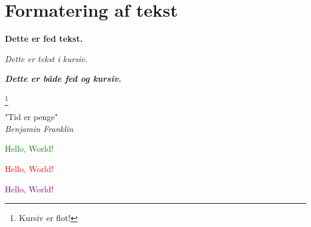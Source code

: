 \chapter{Formatering af tekst}

\textbf{Dette er fed tekst.}

\textit{Dette er tekst i kursiv.}

\textit{\textbf{Dette er både fed og kursiv.}}


\footnote{Kursiv er flot!}

\begin{flushright}
"Tid er penge" \\
\textit{Benjamin Franklin}
\end{flushright}

\textcolor{green}{Hello, World!}

\textcolor{red}{Hello, World!}


\textcolor{purple}{Hello, World!}



